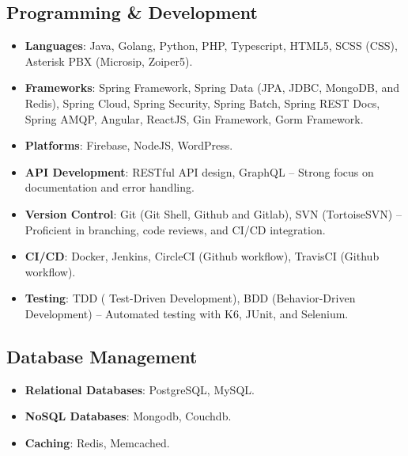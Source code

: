 \begin{cventries}
\begin{row}[cellsep=0.75cm]{1}{1}
\begin{cell}{1}
	\section*{Programming \& Development}
	\vspace{-1.5ex}
    \begin{itemize} 
        \item {\textbf{Languages}: Java, Golang, Python, PHP, Typescript, HTML5, SCSS (CSS), Asterisk PBX (Microsip, Zoiper5).}
        \item {\textbf{Frameworks}: Spring Framework, Spring Data (JPA, JDBC, MongoDB, and Redis), Spring Cloud, Spring Security, Spring Batch, Spring REST Docs, Spring AMQP, Angular, ReactJS, Gin Framework, Gorm Framework.}
        \item {\textbf{Platforms}: Firebase, NodeJS, WordPress.}
        \item {\textbf{API Development}: RESTful API design, GraphQL – Strong focus on documentation and error handling.}
        \item {\textbf{Version Control}: Git (Git Shell, Github and Gitlab), SVN (TortoiseSVN) – Proficient in branching, code reviews, and CI/CD integration.}
        \item {\textbf{CI/CD}: Docker, Jenkins, CircleCI (Github workflow), TravisCI (Github workflow).}
        \item {\textbf{Testing}: TDD ( Test-Driven Development), BDD (Behavior-Driven Development) – Automated testing with K6, JUnit, and Selenium.}
    \end{itemize}
	\end{cell}
\end{row}

\begin{row}[cellsep=0.75cm]{1}{1}
    \begin{cell}{1}
	\section*{Database Management}
	\vspace{-1.5ex}
    \begin{itemize} 
        \item {\textbf{Relational Databases}: PostgreSQL, MySQL.}
        \item {\textbf{NoSQL Databases}: Mongodb, Couchdb.}
        \item {\textbf{Caching}: Redis, Memcached.}
    \end{itemize}
	\end{cell}
\end{row}


\end{cventries}
